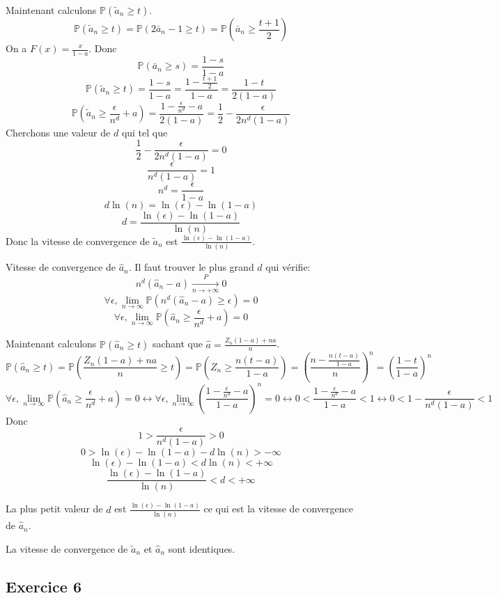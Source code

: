 \documentclass[]{book}
\theoremstyle{definition}
\begin{document}
Maintenant calculons $\mathbb{P}(\tilde{a}_n \geq t)$.
$$
\mathbb{P}(\tilde{a}_n \geq t) = \mathbb{P}(2\bar{a}_n - 1 \geq t) = \mathbb{P}\left(\bar{a}_n \geq \frac{t +1}{2}\right)
$$
On a $F(x) = \frac{x}{1-a}$.
Donc 
$$
\mathbb{P}(\bar{a}_n \geq s) = \frac{1-s}{1-a}
$$
$$
\mathbb{P}(\tilde{a}_n \geq t) = \frac{1-s}{1-a} = \frac{1-\frac{t +1}{2}}{1-a} = \frac{1-t}{2(1-a)}
$$
$$
\mathbb{P}(\tilde{a}_n \geq \frac{\epsilon}{n^d} + a) = \frac{1-\frac{\epsilon}{n^d} - a}{2(1-a)} = \frac{1}{2}-\frac{\epsilon}{2n^d(1-a)}
$$
Cherchons une valeur de $d$ qui tel que
$$
\frac{1}{2}-\frac{\epsilon}{2n^d(1-a)} = 0
$$
$$
\frac{\epsilon}{n^d(1-a)} = 1
$$
$$
n^d = \frac{\epsilon}{1-a}
$$
$$
d\ln(n) = \ln(\epsilon) - \ln(1-a)
$$
$$
d= \frac{\ln(\epsilon) - \ln(1-a)}{\ln(n)}
$$
Donc la vitesse de convergence de $\tilde{a}_n$ est $\frac{\ln(\epsilon) - \ln(1-a)}{\ln(n)}$.

\bigskip
Vitesse de convergence de $\hat{a}_n$.
Il faut trouver le plus grand $d$ qui v\'erifie:
$$
n^d(\hat{a}_n-a) \xrightarrow[n \to +\infty]{P} 0
$$
$$
\forall \epsilon, \lim_{n \to \infty}{\mathbb{P}(n^d(\hat{a}_n-a) \geq \epsilon)} = 0
$$
$$
\forall \epsilon, \lim_{n \to \infty}{\mathbb{P}(\hat{a}_n \geq \frac{\epsilon}{n^d} + a)} = 0
$$

Maintenant calculons $\mathbb{P}(\hat{a}_n \geq t)$ sachant que $\hat{a} = \frac{Z_n(1-a) + na}{n}$.
$$
\mathbb{P}(\hat{a}_n \geq t) = \mathbb{P}(\frac{Z_n(1-a) + na}{n} \geq t) = \mathbb{P}\left(Z_n \geq \frac{n(t-a)}{1-a}\right) = \left(\frac{n- \frac{n(t-a)}{1-a}}{n}\right)^n = \left(\frac{1-t}{1-a}\right)^n
$$
$$
\forall \epsilon, \lim_{n \to \infty}{\mathbb{P}(\hat{a}_n \geq \frac{\epsilon}{n^d} + a)} = 0
\leftrightarrow  \forall \epsilon, \lim_{n \to \infty} \left(\frac{1-\frac{\epsilon}{n^d} - a}{1-a}\right)^n = 0
\leftrightarrow  0 < \frac{1-\frac{\epsilon}{n^d} - a}{1-a} < 1 
\leftrightarrow  0 < 1 - \frac{\epsilon}{n^d(1-a)} < 1
$$
Donc
$$
1 > \frac{\epsilon}{n^d(1-a)} > 0
$$
$$
0 > \ln(\epsilon) - \ln(1-a) - d\ln(n) >-\infty
$$
$$
\ln(\epsilon) - \ln(1-a)  < d\ln(n) < +\infty
$$
$$
\frac{\ln(\epsilon) - \ln(1-a)}{\ln(n)} < d < +\infty
$$

La plus petit valeur de $d$ est $\frac{\ln(\epsilon) - \ln(1-a)}{\ln(n)}$ ce qui est la vitesse de convergence de $\hat{a}_n$.

La vitesse de convergence de $\tilde{a}_n$ et $\hat{a}_n$ sont identiques.


\subsection*{Exercice 6}
\end{document}
